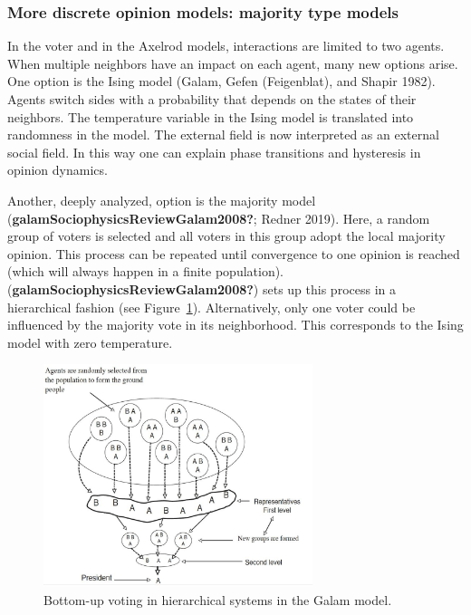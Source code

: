 \documentclass[
  letterpaper,
]{scrbook}
\begin{document}
\hypertarget{more-discrete-opinion-models-majority-type-models}{%
\subsubsection{More discrete opinion models: majority type
models}\label{more-discrete-opinion-models-majority-type-models}}

In the voter and in the Axelrod models, interactions are limited to two
agents. When multiple neighbors have an impact on each agent, many new
options arise. One option is the Ising model (Galam, Gefen (Feigenblat),
and Shapir 1982). Agents switch sides with a probability that depends on
the states of their neighbors. The temperature variable in the Ising
model is translated into randomness in the model. The external field is
now interpreted as an external social field. In this way one can explain
phase transitions and hysteresis in opinion dynamics.

Another, deeply analyzed, option is the majority model
(\textbf{galamSociophysicsReviewGalam2008?}; Redner 2019). Here, a
random group of voters is selected and all voters in this group adopt
the local majority opinion. This process can be repeated until
convergence to one opinion is reached (which will always happen in a
finite population). (\textbf{galamSociophysicsReviewGalam2008?}) sets up
this process in a hierarchical fashion (see
Figure~\ref{fig-ch7-img5-old-93}). Alternatively, only one voter could
be influenced by the majority vote in its neighborhood. This corresponds
to the Ising model with zero temperature.

\begin{figure}

{\centering \includegraphics[width=3.09122in,height=\textheight]{media/ch7/image5.jpg}

}

\caption{\label{fig-ch7-img5-old-93}Bottom-up voting in hierarchical
systems in the Galam model.}

\end{figure}
\end{document}
